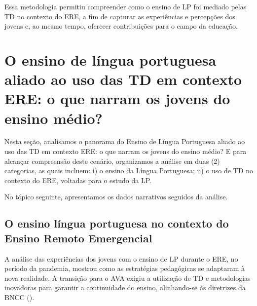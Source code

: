 \documentclass[portuguese]{textolivre}
\begin{document}
Essa metodologia permitiu compreender como o ensino de LP foi mediado pelas TD no contexto do ERE, a fim de capturar as experiências e percepções dos jovens e, ao mesmo tempo, oferecer contribuições para o campo da educação.


\section{O ensino de língua portuguesa aliado ao uso das TD em contexto ERE: o que narram os jovens do ensino médio?}\label{sec-modelo}
Nesta seção, analisamos o panorama do Ensino de Língua Portuguesa aliado ao uso das TD em contexto ERE: o que narram os jovens do ensino médio? E para alcançar compreensão deste cenário, organizamos a análise em duas (2) categorias, as quais incluem: i) o ensino da Língua Portuguesa; ii) o uso de TD no contexto do ERE, voltadas para o estudo da LP.

No tópico seguinte, apresentamos os dados narrativos seguidos da análise.

\subsection{O ensino língua portuguesa no contexto do Ensino Remoto Emergencial}\label{sec-organizacao}
A análise das experiências dos jovens com o ensino de LP durante o ERE, no período da pandemia, mostrou como as estratégias pedagógicas se adaptaram à nova realidade. A transição para o AVA exigiu a utilização de TD e metodologias inovadoras para garantir a continuidade do ensino, alinhando-se às diretrizes da BNCC ().
\end{document}
